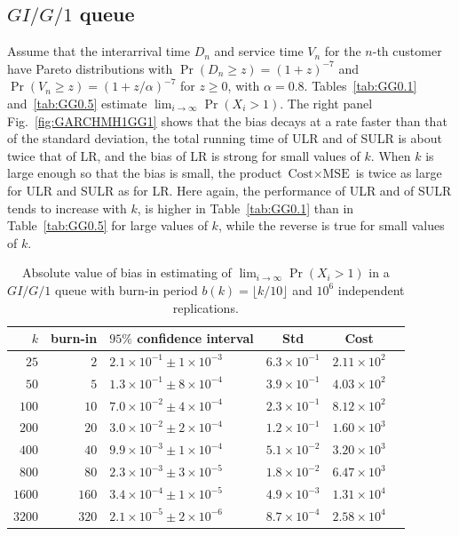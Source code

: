 \documentclass[a4paper,11pt]{article}
\begin{document}
\subsection{\(GI/G/1\) queue}Assume that the  interarrival time \(D_{n}\) and service time \(V_{n}\) for the \(n\)-th customer have Pareto distributions with  \(\Pr(D_{n}\geq z)=(1+z)^{-7}\) and \(\Pr(V_{n}\geq z)=(1+z/\alpha)^{-7}\) for \(z\geq0\), with   \(\alpha=0.8\).
Tables~\ref{tab:GG0.1} and~\ref{tab:GG0.5} estimate \(\lim_{i\rightarrow\infty}\Pr(X_{i}>1)\).  The right panel  Fig.~\ref{fig:GARCHMH1GG1} shows that the bias decays at a rate faster  than that of the standard deviation, the total running time of ULR and of SULR is about twice that of LR, and the bias of LR is strong for small values of  \(k\).  When \(k\) is large enough so that  the bias is small,  the product \(\text{Cost}\times\text{MSE}\) is twice as large for ULR and SULR as for LR.  Here again, the performance of ULR and of  SULR tends to increase with \(k\), is higher in  Table~\ref{tab:GG0.1} than in Table~\ref{tab:GG0.5} for large  values of \(k\), while the reverse  is true for small values of \(k\).
\begin{table}
\caption{Absolute value of bias in estimating of \(\lim_{i\rightarrow\infty}\Pr(X_{i}>1)\) in a \(GI/G/1\) queue with burn-in period  \(b(k)=\lfloor k/10\rfloor\) and \(10^{6}\) independent replications.}
\begin{center}
\begin{small}
\begin{tabular}{rrlccc}\hline
$k$ &  burn-in  & $95\%$ confidence interval  & Std  & Cost \\ \hline
$25$&$2 $ & $2.1\times10^{-1} \pm 1\times10^{-3}$ & $6.3\times10^{-1}$ & $2.11\times10^2$\\
$50$&$5 $ & $1.3\times10^{-1} \pm 8\times10^{-4}$ & $3.9\times10^{-1}$ & $4.03\times10^2$ \\
$100$&$10 $ & $7.0\times10^{-2} \pm 4\times10^{-4}$ & $2.3\times10^{-1}$ & $8.12\times10^2$ \\
$200$&$20 $ & $3.0\times10^{-2} \pm 2\times10^{-4}$ & $1.2\times10^{-1}$ & $1.60\times10^3$ \\
$400$&$40 $ & $9.9\times10^{-3} \pm 1\times10^{-4}$ & $5.1\times10^{-2}$ & $3.20\times10^3$ \\
$800$&$80 $ & $2.3\times10^{-3} \pm 3\times10^{-5}$ & $1.8\times10^{-2}$ & $6.47\times10^3$\\
$1600$&$160 $  & $3.4 \times10^{-4}\pm 1\times10^{-5}$ & $4.9\times10^{-3}$ & $1.31\times10^4$ \\
$3200$&$320 $ & $2.1\times10^{-5} \pm 2\times10^{-6}$ & $8.7\times10^{-4}$ & $2.58\times10^4$\\

\hline\end{tabular}
 \end{small}
 \end{center}
\label{tab:BiasGG0.1}
\end{table}
\end{document}
